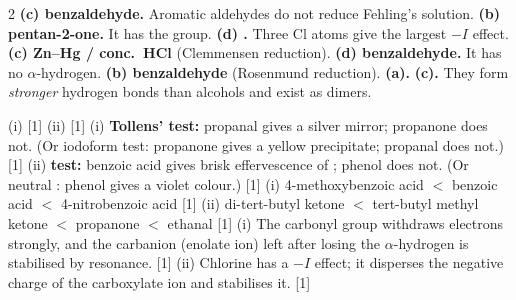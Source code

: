 \documentclass[10pt,a4paper]{extarticle}
\newcommand{\mk}[1]{{\scriptsize\color{black!55}[#1]}}
\begin{document}
\answerstart
\begin{multicols}{2}\raggedcolumns
{}
\An \textbf{(c) benzaldehyde.} Aromatic aldehydes do not reduce Fehling's solution.
\An \textbf{(b) pentan-2-one.} It has the  group.
\An \textbf{(d) .} Three Cl atoms give the largest $-I$ effect.
\An \textbf{(c) Zn--Hg / conc.\ HCl} (Clemmensen reduction).
\An \textbf{(d) benzaldehyde.} It has no $\alpha$-hydrogen.
\An \textbf{(b) benzaldehyde} (Rosenmund reduction).
\An \textbf{(a).}
\An \textbf{(c).} They form \emph{stronger} hydrogen bonds than alcohols and exist as dimers.

\An (i)  \mk{1}\nl
(ii)  \mk{1}
\An (i) \textbf{Tollens' test:} propanal gives a silver mirror; propanone does not. (Or iodoform test: propanone gives a yellow precipitate; propanal does not.) \mk{1}\nl
(ii) \textbf{ test:} benzoic acid gives brisk effervescence of ; phenol does not. (Or neutral : phenol gives a violet colour.) \mk{1}
\An (i) 4-methoxybenzoic acid $<$ benzoic acid $<$ 4-nitrobenzoic acid \mk{1}\nl
(ii) di-tert-butyl ketone $<$ tert-butyl methyl ketone $<$ propanone $<$ ethanal \mk{1}
\An (i) The carbonyl group withdraws electrons strongly, and the carbanion (enolate ion) left after losing the $\alpha$-hydrogen is stabilised by resonance. \mk{1}\nl
(ii) Chlorine has a $-I$ effect; it disperses the negative charge of the carboxylate ion and stabilises it. \mk{1}


\end{multicols}
\end{document}
